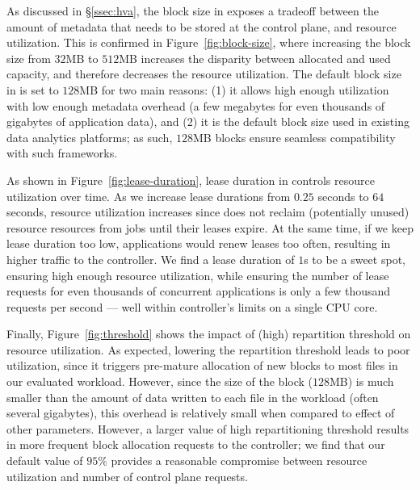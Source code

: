  As discussed in \S\ref{ssec:hva}, the block size in \name exposes a tradeoff between the amount of metadata that needs to be stored at the control plane, and resource utilization. This is confirmed in Figure~\ref{fig:block-size}, where increasing the block size from $32$MB to $512$MB increases the disparity between allocated and used capacity, and therefore decreases the resource utilization. The default block size in \name is set to $128$MB for two main reasons: (1) it allows high enough utilization with low enough metadata overhead (a few megabytes for even thousands of gigabytes of application data), and (2) it is the default block size used in existing data analytics platforms; as such, $128$MB blocks ensure seamless compatibility with such frameworks.

 As shown in Figure~\ref{fig:lease-duration}, lease duration in \name controls resource utilization over time. As we increase lease durations from $0.25$ seconds to $64$ seconds, resource utilization increases since \name does not reclaim (potentially unused) resource resources from jobs until their leases expire. At the same time, if we keep lease duration too low, applications would renew leases too often, resulting in higher traffic to the \name controller. We find a lease duration of $1$s to be a sweet spot, ensuring high enough resource utilization, while ensuring the number of lease requests for even thousands of concurrent applications is only a few thousand requests per second --- well within \name controller's limits on a single CPU core.

 Finally, Figure~\ref{fig:threshold} shows the impact of (high) repartition threshold on resource utilization. As expected, lowering the repartition threshold leads to poor utilization, since it triggers pre-mature allocation of new blocks to most files in our evaluated workload. However, since the size of the block ($128$MB) is much smaller than the amount of data written to each file in the workload (often several gigabytes), this overhead is relatively small when compared to effect of other parameters. However, a larger value of high repartitioning threshold results in more frequent block allocation requests to the controller; we find that our default value of $95\%$ provides a reasonable compromise between resource utilization and number of control plane requests.

